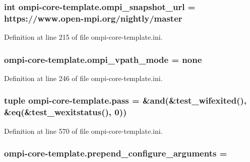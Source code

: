 \hypertarget{namespaceompi-core-template_a931771a1ede0f79aca611cdb2d669fee}{
\subsubsection[{ompi\-\_\-snapshot\-\_\-url}]{\setlength{\rightskip}{0pt plus 5cm}int ompi-\/core-\/template.\-ompi\-\_\-snapshot\-\_\-url = https\-://www.\-open-\/mpi.\-org/nightly/master}}\label{namespaceompi-core-template_a931771a1ede0f79aca611cdb2d669fee}


Definition at line 215 of file ompi-\/core-\/template.\-ini.

\hypertarget{namespaceompi-core-template_a59d3abf6ca7c94e790fd49325d3701f0}{
\subsubsection[{ompi\-\_\-vpath\-\_\-mode}]{\setlength{\rightskip}{0pt plus 5cm}ompi-\/core-\/template.\-ompi\-\_\-vpath\-\_\-mode = none}}\label{namespaceompi-core-template_a59d3abf6ca7c94e790fd49325d3701f0}


Definition at line 246 of file ompi-\/core-\/template.\-ini.

\hypertarget{namespaceompi-core-template_ae24ed89eb7dedea4e66bcbf9b4269705}{
\subsubsection[{pass}]{\setlength{\rightskip}{0pt plus 5cm}tuple ompi-\/core-\/template.\-pass = \&and(\&test\-\_\-wifexited(), \&eq(\&test\-\_\-wexitstatus(), 0))}}\label{namespaceompi-core-template_ae24ed89eb7dedea4e66bcbf9b4269705}


Definition at line 570 of file ompi-\/core-\/template.\-ini.

\hypertarget{namespaceompi-core-template_a9f5830661ad9df1c27b678278222d554}{
\subsubsection[{prepend\-\_\-configure\-\_\-arguments}]{\setlength{\rightskip}{0pt plus 5cm}ompi-\/core-\/template.\-prepend\-\_\-configure\-\_\-arguments =}}\label{namespaceompi-core-template_a9f5830661ad9df1c27b678278222d554}


